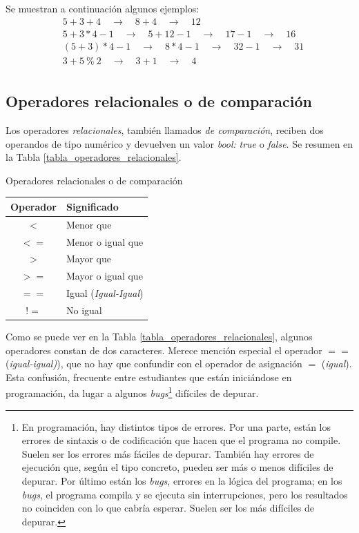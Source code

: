 Se muestran a continuación algunos ejemplos:
\begin{align*}
& 5 + 3 + 4 \quad \rightarrow \quad 8 + 4 \quad \rightarrow \quad 12\\
& 5 + 3 * 4 -1 \quad \rightarrow \quad 5 + 12 - 1 \quad \rightarrow \quad 17 - 1 \quad \rightarrow \quad 16\\
& (5 + 3) * 4 -1 \quad \rightarrow \quad 8 * 4 - 1 \quad \rightarrow \quad 32 - 1 \quad \rightarrow \quad 31\\
& 3 + 5 {\:} \% {\:}  2 \quad \rightarrow \quad 3 + 1 \quad \rightarrow \quad 4\\
\end{align*}

\subsection{Operadores relacionales o de comparación}
\noindent Los operadores \textit{relacionales}, también llamados \textit{de comparación}, reciben dos operandos de tipo numérico y devuelven un valor \textit{bool:} \textit{true} o \textit{false}. Se resumen en la Tabla \ref{tabla_operadores_relacionales}.

\begin{center}
   \begin{mytable}[label=tabla_operadores_relacionales]{\centering\footnotesize Operadores relacionales o de comparación}
      \footnotesize
      \begin{tabular}{c l}
         \hline
         \textbf{Operador} & \textbf{Significado} \\ \hline
         $<$ & Menor que \\
         $<=$ & Menor o igual que \\
         $>$ & Mayor que \\
         $>=$ & Mayor o igual que \\
         $==$ & Igual (\textit{Igual-Igual}) \\
         $!=$ & No igual \\
      \end{tabular}
   \end{mytable}
\end{center}

Como se puede ver en la Tabla \ref{tabla_operadores_relacionales}, algunos operadores constan de dos caracteres. Merece mención especial el operador $==$ (\textit{igual-igual)}), que no hay que confundir con el operador de asignación $=$ (\textit{igual}). Esta confusión, frecuente entre estudiantes que están iniciándose en programación, da lugar a algunos \textit{bugs}\footnote{En programación, hay distintos tipos de errores. Por una parte, están los errores de sintaxis o de codificación que hacen que el programa no compile. Suelen ser los errores más fáciles de depurar. También hay errores de ejecución que, según el tipo concreto, pueden ser más o menos difíciles de depurar. Por último están los \textit{bugs}, errores en la lógica del programa; en los \textit{bugs}, el programa compila y se ejecuta sin interrupciones, pero los resultados no coinciden con lo que cabría esperar. Suelen ser los más difíciles de depurar.} difíciles de depurar.

